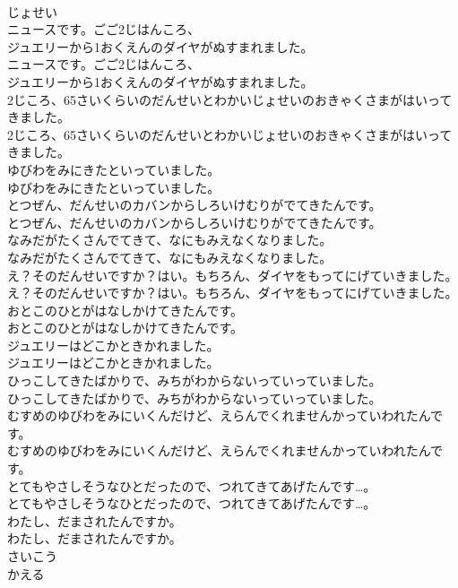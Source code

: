 \documentclass[8pt]{extreport}
\begin{document}
\begin{CJK}{UTF8}{min}
\\	じょせい
\\	ニュースです。ごご2じはんころ、
\\	ジュエリーから1おくえんのダイヤがぬすまれました。
\\	ニュースです。ごご2じはんころ、
\\	ジュエリーから1おくえんのダイヤがぬすまれました。
\\	2じころ、65さいくらいのだんせいとわかいじょせいのおきゃくさまがはいってきました。
\\	2じころ、65さいくらいのだんせいとわかいじょせいのおきゃくさまがはいってきました。
\\	ゆびわをみにきたといっていました。
\\	ゆびわをみにきたといっていました。
\\	とつぜん、だんせいのカバンからしろいけむりがでてきたんです。
\\	とつぜん、だんせいのカバンからしろいけむりがでてきたんです。
\\	なみだがたくさんでてきて、なにもみえなくなりました。
\\	なみだがたくさんでてきて、なにもみえなくなりました。
\\	え？そのだんせいですか？はい。もちろん、ダイヤをもってにげていきました。
\\	え？そのだんせいですか？はい。もちろん、ダイヤをもってにげていきました。
\\	おとこのひとがはなしかけてきたんです。
\\	おとこのひとがはなしかけてきたんです。
\\	ジュエリーはどこかときかれました。
\\	ジュエリーはどこかときかれました。
\\	ひっこしてきたばかりで、みちがわからないっていっていました。
\\	ひっこしてきたばかりで、みちがわからないっていっていました。
\\	むすめのゆびわをみにいくんだけど、えらんでくれませんかっていわれたんです。
\\	むすめのゆびわをみにいくんだけど、えらんでくれませんかっていわれたんです。
\\	とてもやさしそうなひとだったので、つれてきてあげたんです…。
\\	とてもやさしそうなひとだったので、つれてきてあげたんです…。
\\	わたし、だまされたんですか。
\\	わたし、だまされたんですか。
\\	さいこう
\\	かえる

\end{CJK}
\end{document}
